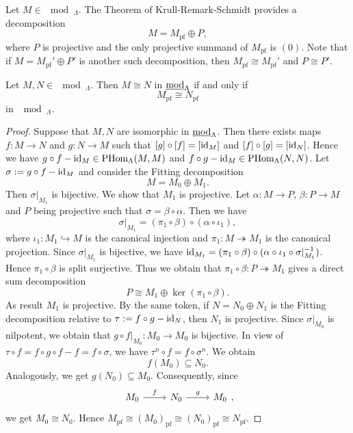 
Let $M\in\mod_\Lambda$. The Theorem of Krull-Remark-Schmidt provides a decomposition
\[
M = M_{\text{pf}} \oplus P,
\]
where $P$ is projective and the only projective summand of $M_{\text{pf}}$ is $(0)$. Note that if $M = M_{\text{pf}}' \oplus P'$ is another such decomposition, then $M_{\text{pf}}\cong M_{\text{pf}}'$ and $P\cong P'$.


\begin{lemma}\label{2.2.4}
Let $M,N\in\mod_\Lambda$. Then $M\cong N$ in $\underline{\operatorname{mod}}_\Lambda$ if and only if
\[
M_{\mathrm{pf}}\cong N_{\mathrm{pf}}
\]
in $\mod_\Lambda$.
\end{lemma}


\begin{proof}
Suppose that $M,N$ are isomorphic in $\underline{\operatorname{mod}}_\Lambda$. Then there exists maps $f:M\to N$ and $g:N\to M$ such that $[g]\circ [f]=[\operatorname{id}_M]$ and $[f]\circ [g]=[\operatorname{id}_N]$. Hence we have $g\circ f-\operatorname{id}_M\in\operatorname{PHom}_\Lambda(M,M)$ and $f\circ g-\operatorname{id}_M\in\operatorname{PHom}_\Lambda(N,N)$. Let $\sigma:=g \circ f - \operatorname{id}_M$ and consider the Fitting decomposition
\[
M=M_0\oplus M_1.
\]
Then $\sigma|_{M_1}$ is bijective. We show that $M_1$ is projective. Let $\alpha:M\to P$, $\beta:P\to M$ and $P$ being projective such that $\sigma = \beta\circ\alpha$. Then we have
\[
\sigma|_{M_1} = (\pi_1\circ \beta) \circ (\alpha\circ \iota_1),
\]
where $\iota_1:M_1\hookrightarrow M$ is the canonical injection and $\pi_1:M\twoheadrightarrow M_1$ is the canonical projection. Since $\sigma|_{M_1}$ is bijective, we have $\operatorname{id}_{M_1} = (\pi_1\circ \beta) \circ (\alpha\circ \iota_1 \circ \sigma|_{M_1}^{-1})$. Hence $\pi_1\circ \beta$ is split surjective. Thus we obtain that $\pi_1\circ \beta:P\twoheadrightarrow M_1$ gives a direct sum decomposition
\[
P \cong M_1 \oplus \ker(\pi_1\circ \beta).
\]
As result $M_1$ is projective. By the same token, if $N=N_0\oplus N_1$ is the Fitting decomposition relative to $\tau:=f\circ g-\operatorname{id}_N$, then $N_1$ is projective. Since $\sigma|_{M_0}$ is nilpotent, we obtain that $g\circ f|_{M_0}:M_0\to M_0$ is bijective. In view of $\tau \circ f = f \circ g \circ f - f = f \circ \sigma$, we have $\tau^n\circ f=f\circ \sigma^n $. We obtain
\[
f(M_0)\subseteq N_0.
\]
Analogously, we get $g(N_0)\subseteq M_0$. Consequently, since
\[
\begin{tikzcd}
M_0 \rar["f"] & N_0 \rar["g"] & M_0    
\end{tikzcd},
\]
we get $M_0\cong N_0$. Hence $M_{\mathrm{pf}}\cong(M_0)_{\mathrm{pf}}\cong(N_0)_{\mathrm{pf}}\cong N_{\mathrm{pf}}$.\qedhere
\end{proof}

